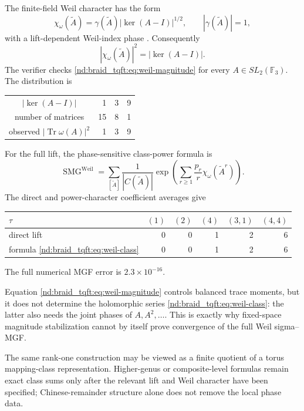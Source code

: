 \documentclass[10pt]{article}
\newcommand{\Tr}{\operatorname{Tr}}
\newcommand{\SMG}{\operatorname{SMG}}
\newcommand{\MGF}{\SMG}
\newcommand{\F}{\mathbb F}
\begin{document}
The finite-field Weil character has the form
\begin{equation}\label{nd:braid_tqft:eq:weil-character}
\chi_\omega(\widetilde A)=\gamma(\widetilde A)
|\ker(A-I)|^{1/2},\qquad |\gamma(\widetilde A)|=1,
\end{equation}
with a lift-dependent Weil-index phase \cite{nd:braid_tqft:thomas}.  Consequently
\begin{equation}\label{nd:braid_tqft:eq:weil-magnitude}
|\chi_\omega(\widetilde A)|^2=|\ker(A-I)|.
\end{equation}
The verifier checks \eqref{nd:braid_tqft:eq:weil-magnitude} for every $A\in SL_2(\F_3)$.
The distribution is
\begin{center}
\begin{tabular}{@{}crrr@{}}
\toprule
$|\ker(A-I)|$&1&3&9\\
number of matrices&15&8&1\\
observed $|\Tr\omega(A)|^2$&1&3&9\\
\bottomrule
\end{tabular}
\end{center}

For the full lift, the phase-sensitive class-power formula is
\begin{equation}\label{nd:braid_tqft:eq:weil-class}
\MGF^{\mathrm{Weil}}=
\sum_{[\widetilde A]}\frac1{|C(\widetilde A)|}
\exp\!\left(\sum_{r\geq1}\frac{p_r}{r}
\chi_\omega(\widetilde A^r)\right).
\end{equation}
The direct and power-character coefficient averages give
\begin{center}
\begin{tabular}{@{}lrrrrr@{}}
\toprule
$\tau$&$(1)$&$(2)$&$(4)$&$(3,1)$&$(4,4)$\\
\midrule
direct lift&0&0&1&2&6\\
formula \eqref{nd:braid_tqft:eq:weil-class}&0&0&1&2&6\\
\bottomrule
\end{tabular}
\end{center}
The full numerical MGF error is $2.3\times10^{-16}$.

Equation \eqref{nd:braid_tqft:eq:weil-magnitude} controls balanced trace moments, but it does
not determine the holomorphic series \eqref{nd:braid_tqft:eq:weil-class}: the latter also
needs the joint phases of $A,A^2,\ldots$.  This is exactly why fixed-space
magnitude stabilization cannot by itself prove convergence of the full Weil
sigma--MGF.

The same rank-one construction may be viewed as a finite quotient of a torus
mapping-class representation.  Higher-genus or composite-level formulas
remain exact class sums only after the relevant lift and Weil character have
been specified; Chinese-remainder structure alone does not remove the local
phase data.
\end{document}
